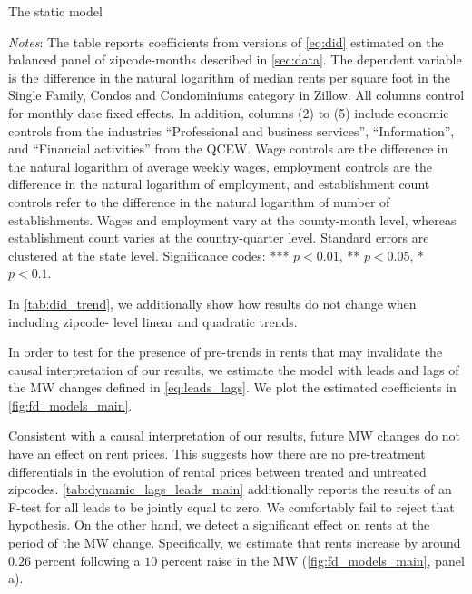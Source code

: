 \begin{table}[h!]
    \caption{The static model}
    \label{tab:did_main}
    \centering
    
    \begin{minipage}{0.9\textwidth} \footnotesize
		\vspace{3mm} 
		\textit{Notes}: The table reports coefficients from versions of \autoref{eq:did} 
		estimated on the balanced panel of zipcode-months described in \autoref{sec:data}. 
		The dependent variable is the difference in the natural logarithm of median	rents 
		per square foot in the Single Family, Condos and Condominiums category in Zillow. 
		All columns control for monthly date fixed effects. In addition, columns (2) to 
		(5) include economic controls from the industries ``Professional and business 
		services'', ``Information'', and ``Financial activities'' from the QCEW. Wage 
		controls are the difference in the natural logarithm of average weekly wages, 
		employment controls are the difference in the natural logarithm of employment, 
		and establishment count controls refer to the difference in the natural logarithm 
		of number of establishments. Wages and employment vary at the county-month level,
		whereas establishment count varies at the country-quarter level. Standard errors 
		are clustered at the state level. Significance codes: *** $p < 0.01$, ** $p < 0.05$, 
		* $p < 0.1$.
	\end{minipage}
\end{table}

In \autoref{tab:did_trend}, we additionally show how results do not change when including zipcode-
level linear and quadratic trends. 

In order to test for the presence of pre-trends in rents that may invalidate the causal 
interpretation of our results, we estimate the model with leads and lags of the MW changes defined 
in \autoref{eq:leads_lags}. We plot the estimated coefficients in \autoref{fig:fd_models_main}.

Consistent with a causal interpretation of our results, future MW changes do not have an effect on 
rent prices. This suggests how there are no pre-treatment differentials in the evolution of rental 
prices between treated and untreated zipcodes. \autoref{tab:dynamic_lags_leads_main} additionally 
reports the results of an F-test for all leads to be jointly equal to zero. We comfortably fail to 
reject that hypothesis. On the other hand, we detect a significant effect on rents at 
the period of the MW change. Specifically, we estimate that rents increase by around $0.26 $ percent 
following a $10$ percent raise in the MW (\autoref{fig:fd_models_main}, panel a).

